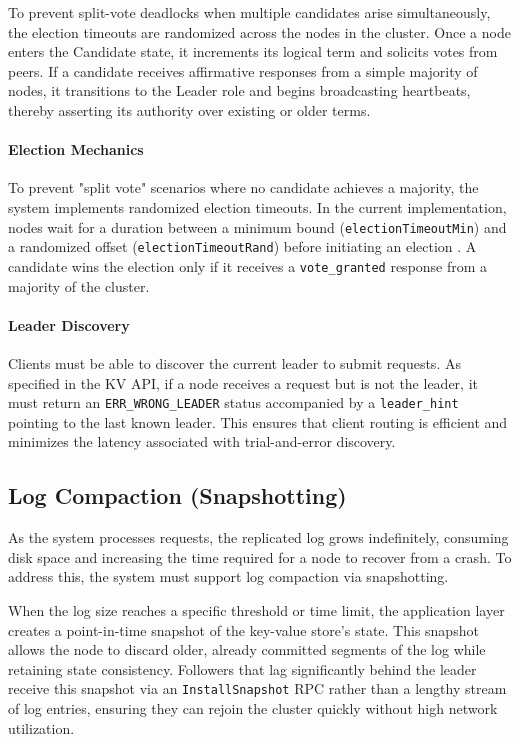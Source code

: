 To prevent split-vote deadlocks when multiple candidates arise simultaneously, the election timeouts are randomized across the nodes in the cluster. Once a node enters the Candidate state, it increments its logical term and solicits votes from peers. If a candidate receives affirmative responses from a simple majority of nodes, it transitions to the Leader role and begins broadcasting heartbeats, thereby asserting its authority over existing or older terms.

\paragraph{Election Mechanics}
To prevent "split vote" scenarios where no candidate achieves a majority, the system implements randomized election timeouts. In the current implementation, nodes wait for a duration between a minimum bound (\texttt{electionTimeoutMin}) and a randomized offset (\texttt{electionTimeoutRand}) before initiating an election \cite{Raft2014}. A candidate wins the election only if it receives a \texttt{vote\_granted} response from a majority of the cluster.

\paragraph{Leader Discovery}
Clients must be able to discover the current leader to submit requests. As specified in the KV API, if a node receives a request but is not the leader, it must return an \texttt{ERR\_WRONG\_LEADER} status accompanied by a \texttt{leader\_hint} pointing to the last known leader. This ensures that client routing is efficient and minimizes the latency associated with trial-and-error discovery.

\subsection{Log Compaction (Snapshotting)}
As the system processes requests, the replicated log grows indefinitely, consuming disk space and increasing the time required for a node to recover from a crash. To address this, the system must support log compaction via snapshotting.

When the log size reaches a specific threshold or time limit, the application layer creates a point-in-time snapshot of the key-value store's state. This snapshot allows the node to discard older, already committed segments of the log while retaining state consistency. Followers that lag significantly behind the leader receive this snapshot via an \texttt{InstallSnapshot} RPC rather than a lengthy stream of log entries, ensuring they can rejoin the cluster quickly without high network utilization.

